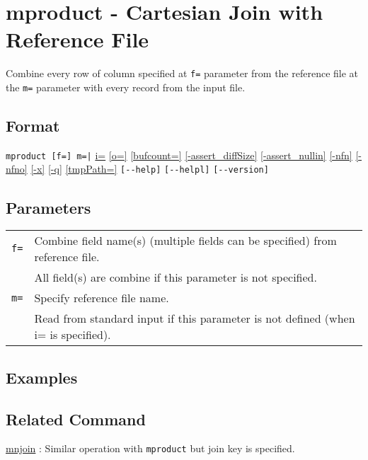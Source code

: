 
%

\section{mproduct - Cartesian Join with Reference File\label{sect:mproduct}}

Combine every row of column specified at \verb|f=| parameter from the reference file at the \verb|m=| parameter with every record from the input file. 


\subsection*{Format}
\verb/mproduct [f=] m=|/
\hyperref[sect:option_i]{i=}
\hyperref[sect:option_o]{[o=]}
\hyperref[sect:option_bufcount]{[bufcount=]} 
\hyperref[sect:option_assert_diffSize]{[-assert\_diffSize]}
\hyperref[sect:option_assert_nullin]{[-assert\_nullin]}
\hyperref[sect:option_nfn]{[-nfn]} 
\hyperref[sect:option_nfno]{[-nfno]}  
\hyperref[sect:option_x]{[-x]}
\hyperref[sect:option_q]{[-q]}
\hyperref[sect:option_option_tmppath]{[tmpPath=]}
\verb|[--help]|
\verb|[--helpl]|
\verb|[--version]|\\

\subsection*{Parameters}
\begin{table}[htbp]
{\small
\begin{tabular}{ll}
\verb|f=|    & Combine field name(s) (multiple fields can be specified) from reference file. \\
             & All field(s) are combine if this parameter is not specified. \\
\verb|m=|    & Specify reference file name. \\
             & Read from standard input if this parameter is not defined (when i= is specified).\\
\end{tabular} 
}
\end{table} 

\subsection*{Examples}

\subsection*{Related Command}

\hyperref[sect:mnjoin]{mnjoin} : Similar operation with \verb|mproduct| but join key is specified. 

%
